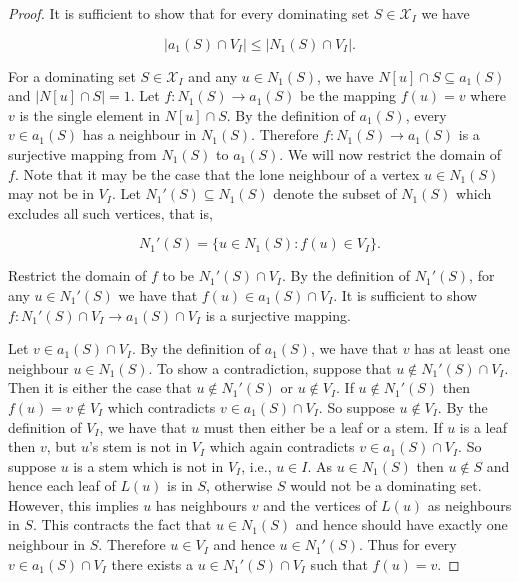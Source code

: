 \documentclass[11pt]{article}
\newcommand{\edit}[1]{\textcolor{black}{#1}}
\newcommand{\A}[3][\mathcal{D}_G]{\mathcal{A}_{#3}(#2, #1)}
\newcommand{\N}[3][\mathcal{D}_G]{\mathcal{N}_{#3}(#2, #1)}
\begin{document}
\begin{proof}
It is sufficient to show that for every dominating set $S \in \mathcal{X}_I$ we have

$$|a_1(S) \cap V_{I}| \leq |N_1(S) \cap V_{I}|.$$

\noindent For a dominating set $S \in \mathcal{X}_I$ and any $u \in N_1(S)$, we have $N[u] \cap S \subseteq a_1(S)$ and $|N[u] \cap S|=1$. Let $f:N_1(S) \rightarrow a_1(S)$ be the mapping $f(u) = v$ where $v$ is the single element in $N[u] \cap S$. By the definition of $a_1(S)$, every $v \in a_1(S)$ has a neighbour in $N_1(S)$. Therefore $f:N_1(S) \rightarrow a_1(S)$ is a surjective mapping from $N_1(S)$ to $a_1(S)$. We will now restrict the domain of $f$. Note that it may be the case that the lone neighbour of a vertex $u \in N_1(S)$ may not be in $V_{I}$. Let $N_1'(S) \subseteq N_1(S)$ denote the subset of $N_1(S)$ which excludes all such vertices, that is,

$$N_1'(S)= \{u \in N_1(S) : f(u) \in V_{I}\}.$$

\noindent Restrict the domain of $f$ to be $N_1'(S)\cap V_{I}$. By the definition of $N_1'(S)$, for any $u \in N_1'(S)$ we have that $f(u) \in a_1(S)\cap V_{I}$. It is sufficient to show $f:N_1'(S)\cap V_{I} \rightarrow a_1(S)\cap V_{I}$ is a surjective mapping.

Let $v \in a_1(S)\cap V_{I}$. By the definition of $a_1(S)$, we have that $v$ has at least one neighbour $u \in N_1(S)$. To show a contradiction, suppose that $u \notin N_1'(S)\cap V_{I}$. Then it is either the case that $u \notin N_1'(S)$ or $u \notin V_{I}$. If $u \notin N_1'(S)$ then $f(u)=v \notin V_{I}$ which contradicts $v \in a_1(S)\cap V_{I}$. So suppose $u \notin V_{I}$. By the definition of $V_{I}$, we have that $u$ must then either be a leaf or a stem. If $u$ is a leaf then $v$, but $u$'s stem is not in $V_{I}$ which again contradicts $v \in a_1(S)\cap V_{I}$. So suppose $u$ is a stem which is not in $V_{I}$, i.e., $u\in I$.%
 As $u \in N_1(S)$ then $u \notin S$ and hence each leaf of $L(u)$ is in $S$, otherwise $S$ would not be a dominating set. However, this implies $u$ has neighbours $v$ and the vertices of $L(u)$ as neighbours in $S$.  This contracts the fact that $u \in N_1(S)$ and hence should have exactly one neighbour in $S$. Therefore $u \in V_{I}$ and hence $u \in N_1'(S)$. Thus for every $v \in a_1(S)\cap V_{I}$ there exists a $u \in N_1'(S)\cap V_I$ such that $f(u)=v$.


\end{proof}
\end{document}
